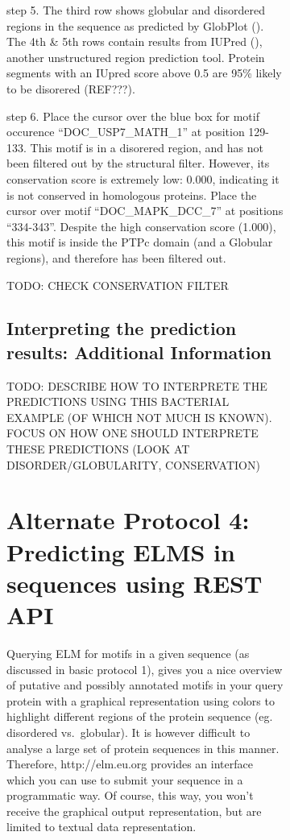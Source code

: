 {\begin{figure}[h!]
{{\begin{figure}[h!]
{{step 5. The third row shows globular and disordered regions in the
sequence as predicted by GlobPlot (\cite{12824398}). The 4th \& 5th rows
contain results from IUPred (\cite{15955779}), another unstructured
region prediction tool. Protein segments with an IUpred score above 0.5
are 95\% likely to be disorered (REF???).

step 6. Place the cursor over the blue box for motif occurence
``DOC\_USP7\_MATH\_1'' at position 129-133. This motif is in a disorered
region, and has not been filtered out by the structural filter. However,
its conservation score is extremely low: 0.000, indicating it is not
conserved in homologous proteins. Place the cursor over motif
``DOC\_MAPK\_DCC\_7'' at positions ``334-343''. Despite the high
conservation score (1.000), this motif is inside the PTPc domain (and a
Globular regions), and therefore has been filtered out.

TODO: CHECK CONSERVATION FILTER

\subsection{Interpreting the prediction results: Additional
Information}\label{interpreting-the-prediction-results-additional-information}

TODO: DESCRIBE HOW TO INTERPRETE THE PREDICTIONS USING THIS BACTERIAL
EXAMPLE (OF WHICH NOT MUCH IS KNOWN). FOCUS ON HOW ONE SHOULD INTERPRETE
THESE PREDICTIONS (LOOK AT DISORDER/GLOBULARITY, CONSERVATION)

\section{Alternate Protocol 4: Predicting ELMS in sequences using REST
API}\label{alternate-protocol-4-predicting-elms-in-sequences-using-rest-api}

Querying ELM for motifs in a given sequence (as discussed in basic
protocol 1), gives you a nice overview of putative and possibly
annotated motifs in your query protein with a graphical representation
using colors to highlight different regions of the protein sequence (eg.
disordered vs.~globular). It is however difficult to analyse a large set
of protein sequences in this manner. Therefore, http://elm.eu.org
provides an interface which you can use to submit your sequence in a
programmatic way. Of course, this way, you won't receive the graphical
output representation, but are limited to textual data representation.

}}
\end{figure}}}
\end{figure}}
